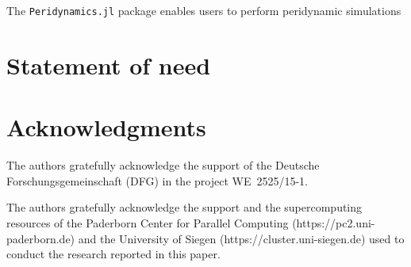 \documentclass{juliacon}
\begin{document}
The \texttt{Peridynamics.jl} package enables users to perform peridynamic simulations 

\cite{bezanson2017julia}

\section{Statement of need}

\section{Acknowledgments}
The authors gratefully acknowledge the support of the Deutsche Forschungsgemeinschaft (DFG) in the project \mbox{WE~2525/15-1}.

The authors gratefully acknowledge the support and the supercomputing resources of the Paderborn Center for Parallel Computing (https://pc2.uni-paderborn.de) and the University of Siegen (https://cluster.uni-siegen.de) used to conduct the research reported in this paper.



\end{document}
